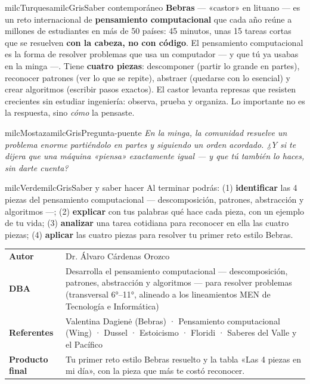 \documentclass[11pt,letterpaper]{article}
\begin{document}
\begin{softbox}{milcTurquesa}{milcGris}{Saber contemporáneo}
\textbf{Bebras} --- «castor» en lituano --- es un reto internacional de \textbf{pensamiento computacional} que cada año reúne a millones de estudiantes en más de 50 países: 45 minutos, unas 15 tareas cortas que se resuelven \textbf{con la cabeza, no con código}. El pensamiento computacional es la forma de resolver problemas que usa un computador --- y que tú ya usabas en la minga ---. Tiene \textbf{cuatro piezas}: descomponer (partir lo grande en partes), reconocer patrones (ver lo que se repite), abstraer (quedarse con lo esencial) y crear algoritmos (escribir pasos exactos). El castor levanta represas que resisten crecientes sin estudiar ingeniería: observa, prueba y organiza. Lo importante no es la respuesta, sino \emph{cómo} la pensaste.
\end{softbox}

\begin{softbox}{milcMostaza}{milcGris}{Pregunta-puente}
\textit{En la minga, la comunidad resuelve un problema enorme partiéndolo en partes y siguiendo un orden acordado. ¿Y si te dijera que una máquina «piensa» exactamente igual --- y que tú también lo haces, sin darte cuenta?}
\end{softbox}

\begin{softbox}{milcVerde}{milcGris}{Saber y saber hacer}
Al terminar podrás: (1) \textbf{identificar} las 4 piezas del pensamiento computacional --- descomposición, patrones, abstracción y algoritmos ---; (2) \textbf{explicar} con tus palabras qué hace cada pieza, con un ejemplo de tu vida; (3) \textbf{analizar} una tarea cotidiana para reconocer en ella las cuatro piezas; (4) \textbf{aplicar} las cuatro piezas para resolver tu primer reto estilo Bebras.
\end{softbox}



\small
\begin{tabularx}{\textwidth}{>{\bfseries}p{3.0cm}Y}
Autor & Dr. Álvaro Cárdenas Orozco\\
DBA & Desarrolla el pensamiento computacional --- descomposición, patrones, abstracción y algoritmos --- para resolver problemas (transversal 6°--11°, alineado a los lineamientos MEN de Tecnología e Informática)\\
Referentes & Valentina Dagienė (Bebras) · Pensamiento computacional (Wing) · Dussel · Estoicismo · Floridi · Saberes del Valle y el Pacífico\\
Producto final & Tu primer reto estilo Bebras resuelto y la tabla «Las 4 piezas en mi día», con la pieza que más te costó reconocer.\\
\end{tabularx}
\normalsize
\end{document}
